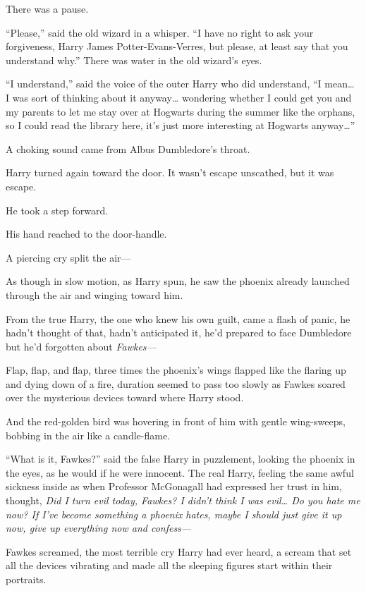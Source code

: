 There was a pause.

``Please,'' said the old wizard in a whisper. ``I have no right to ask
your forgiveness, Harry James Potter-Evans-Verres, but please, at least
say that you understand why.'' There was water in the old wizard's eyes.

``I understand,'' said the voice of the outer Harry who did understand,
``I mean\ldots{} I was sort of thinking about it anyway\ldots{}
wondering whether I could get you and my parents to let me stay over at
Hogwarts during the summer like the orphans, so I could read the library
here, it's just more interesting at Hogwarts anyway\ldots{}''

A choking sound came from Albus Dumbledore's throat.

Harry turned again toward the door. It wasn't escape unscathed, but it
was escape.

He took a step forward.

His hand reached to the door-handle.

A piercing cry split the air---

As though in slow motion, as Harry spun, he saw the phoenix already
launched through the air and winging toward him.

From the true Harry, the one who knew his own guilt, came a flash of
panic, he hadn't thought of that, hadn't anticipated it, he'd prepared
to face Dumbledore but he'd forgotten about \emph{Fawkes---}

Flap, flap, and flap, three times the phoenix's wings flapped like the
flaring up and dying down of a fire, duration seemed to pass too slowly
as Fawkes soared over the mysterious devices toward where Harry stood.

And the red-golden bird was hovering in front of him with gentle
wing-sweeps, bobbing in the air like a candle-flame.

``What is it, Fawkes?'' said the false Harry in puzzlement, looking the
phoenix in the eyes, as he would if he were innocent. The real Harry,
feeling the same awful sickness inside as when Professor McGonagall had
expressed her trust in him, thought, \emph{Did I turn evil today,
Fawkes? I didn't think I was evil\ldots{} Do you hate me now? If I've
become something a phoenix hates, maybe I should just give it up now,
give up everything now and confess---}

Fawkes screamed, the most terrible cry Harry had ever heard, a scream
that set all the devices vibrating and made all the sleeping figures
start within their portraits.

